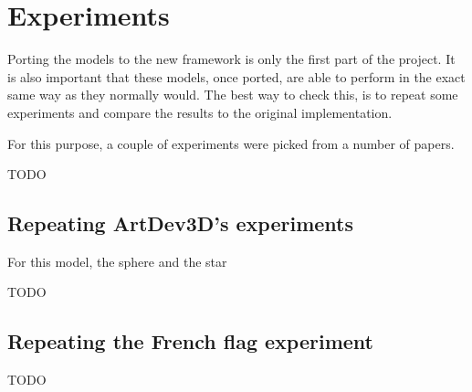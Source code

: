 \section{Experiments}
Porting the models to the new framework is only the first part of the project. It is also important that these models, once ported, are able to perform in the exact same way as they normally would. The best way to check this, is to repeat some experiments and compare the results to the original implementation.

For this purpose, a couple of experiments were picked from a number of papers.

TODO

\subsection{Repeating ArtDev3D's experiments}
For this model, the sphere and the star

TODO



\subsection{Repeating the French flag experiment}

TODO

